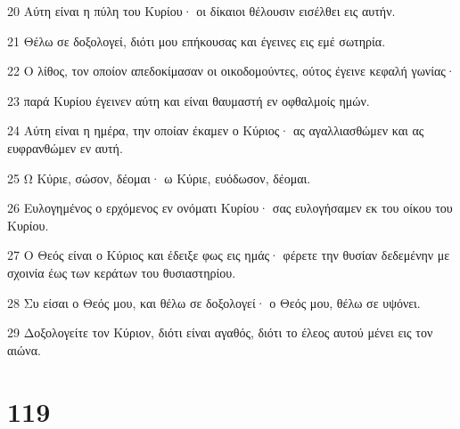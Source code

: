 \par 20 Αύτη είναι η πύλη του Κυρίου· οι δίκαιοι θέλουσιν εισέλθει εις αυτήν.
\par 21 Θέλω σε δοξολογεί, διότι μου επήκουσας και έγεινες εις εμέ σωτηρία.
\par 22 Ο λίθος, τον οποίον απεδοκίμασαν οι οικοδομούντες, ούτος έγεινε κεφαλή γωνίας·
\par 23 παρά Κυρίου έγεινεν αύτη και είναι θαυμαστή εν οφθαλμοίς ημών.
\par 24 Αύτη είναι η ημέρα, την οποίαν έκαμεν ο Κύριος· ας αγαλλιασθώμεν και ας ευφρανθώμεν εν αυτή.
\par 25 Ω Κύριε, σώσον, δέομαι· ω Κύριε, ευόδωσον, δέομαι.
\par 26 Ευλογημένος ο ερχόμενος εν ονόματι Κυρίου· σας ευλογήσαμεν εκ του οίκου του Κυρίου.
\par 27 Ο Θεός είναι ο Κύριος και έδειξε φως εις ημάς· φέρετε την θυσίαν δεδεμένην με σχοινία έως των κεράτων του θυσιαστηρίου.
\par 28 Συ είσαι ο Θεός μου, και θέλω σε δοξολογεί· ο Θεός μου, θέλω σε υψόνει.
\par 29 Δοξολογείτε τον Κύριον, διότι είναι αγαθός, διότι το έλεος αυτού μένει εις τον αιώνα.

\chapter{119}

